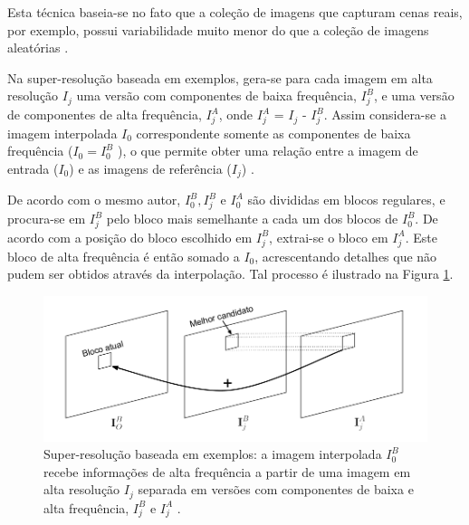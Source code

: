 Esta técnica baseia-se no fato que a coleção de imagens que capturam cenas reais, por exemplo, possui variabilidade muito menor do que a coleção de imagens aleatórias \cite{garcia2013tecnicas}.

Na super-resolução baseada em exemplos, gera-se para cada imagem em alta resolução $I_j$ uma versão com componentes de baixa frequência, $I_j^B$, e uma versão de componentes de alta frequência, $I_j^A$, onde $I_j^A$ = $I_j$ - $I_j^B$. Assim considera-se a imagem interpolada $I_0$ correspondente somente as componentes de baixa frequência ($I_0 = I_0^B$ ), o que permite obter uma relação entre a imagem de entrada ($I_0$) e as imagens de referência ($I_j$) \cite{garcia2013tecnicas}.

De acordo com o mesmo autor, $I_0^B, I_j^B$ e $I_0^A$ são divididas em blocos regulares, e procura-se em $I^B_j$ pelo bloco mais semelhante a cada um dos blocos de $I_0^B$. De acordo com a posição do bloco escolhido em $I_j^B$, extrai-se o bloco em $I_j^A$. Este bloco de alta frequência é então somado a $I_0$, acrescentando detalhes que não pudem ser obtidos através da interpolação. Tal processo é ilustrado na Figura \ref{fig:SR_4}.

\begin{figure}[h]
	\centering
	\includegraphics[scale=0.50]{figuras/superresolucao_4.png}
	\caption{Super-resolução baseada em exemplos: a imagem interpolada $I_0^B$ recebe informações de alta frequência a partir de uma imagem em alta resolução $I_j$ separada em versões com componentes de baixa e alta frequência, $I_j^B$ e $I_j^A$ \cite{garcia2013tecnicas}.}

	\label{fig:SR_4}
\end{figure}

